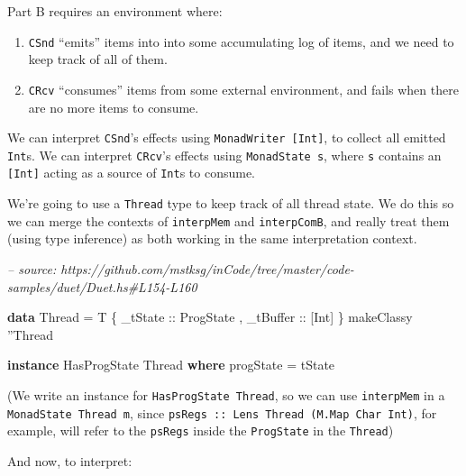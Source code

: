 \documentclass[]{article}
\newenvironment{Shaded}{}{}
\newcommand{\CharTok}[1]{\textcolor[rgb]{0.25,0.44,0.63}{#1}}
\newcommand{\CommentTok}[1]{\textcolor[rgb]{0.38,0.63,0.69}{\textit{#1}}}
\newcommand{\DataTypeTok}[1]{\textcolor[rgb]{0.56,0.13,0.00}{#1}}
\newcommand{\FunctionTok}[1]{\textcolor[rgb]{0.02,0.16,0.49}{#1}}
\newcommand{\KeywordTok}[1]{\textcolor[rgb]{0.00,0.44,0.13}{\textbf{#1}}}
\newcommand{\NormalTok}[1]{#1}
\newcommand{\OtherTok}[1]{\textcolor[rgb]{0.00,0.44,0.13}{#1}}
\begin{document}
Part B requires an environment where:

\begin{enumerate}
\def\labelenumi{\arabic{enumi}.}
\tightlist
\item
  \texttt{CSnd} ``emits'' items into into some accumulating log of items, and we
  need to keep track of all of them.
\item
  \texttt{CRcv} ``consumes'' items from some external environment, and fails
  when there are no more items to consume.
\end{enumerate}

We can interpret \texttt{CSnd}'s effects using \texttt{MonadWriter\ {[}Int{]}},
to collect all emitted \texttt{Int}s. We can interpret \texttt{CRcv}'s effects
using \texttt{MonadState\ s}, where \texttt{s} contains an \texttt{{[}Int{]}}
acting as a source of \texttt{Int}s to consume.

We're going to use a \texttt{Thread} type to keep track of all thread state. We
do this so we can merge the contexts of \texttt{interpMem} and
\texttt{interpComB}, and really treat them (using type inference) as both
working in the same interpretation context.

\begin{Shaded}
\begin{Highlighting}[]
\CommentTok{-- source: https://github.com/mstksg/inCode/tree/master/code-samples/duet/Duet.hs#L154-L160}

\KeywordTok{data} \DataTypeTok{Thread} \FunctionTok{=} \DataTypeTok{T}\NormalTok{ \{}\OtherTok{ _tState   ::} \DataTypeTok{ProgState}
\NormalTok{                ,}\OtherTok{ _tBuffer  ::}\NormalTok{ [}\DataTypeTok{Int}\NormalTok{]}
\NormalTok{                \}}
\NormalTok{makeClassy }\CharTok{''}\DataTypeTok{Thread}

\KeywordTok{instance} \DataTypeTok{HasProgState} \DataTypeTok{Thread} \KeywordTok{where}
\NormalTok{    progState }\FunctionTok{=}\NormalTok{ tState}
\end{Highlighting}
\end{Shaded}

(We write an instance for \texttt{HasProgState\ Thread}, so we can use
\texttt{interpMem} in a \texttt{MonadState\ Thread\ m}, since
\texttt{psRegs\ ::\ Lens\textquotesingle{}\ Thread\ (M.Map\ Char\ Int)}, for
example, will refer to the \texttt{psRegs} inside the \texttt{ProgState} in the
\texttt{Thread})

And now, to interpret:
\end{document}
